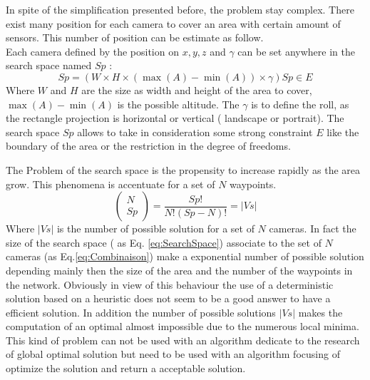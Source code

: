 In spite of the simplification presented before, the problem stay complex. There exist many position for each camera to cover an area with certain amount of sensors. This number of position can be estimate as follow.\\   
Each camera defined by the position on $x, y, z $ and $ \gamma$ can be set anywhere in the search space  named $Sp$ : 
\begin{equation}\label{eq:SearchSpace}
 Sp=(W\times H \times ( \max(A)-\min(A)) \times \gamma )  Sp \in E 
\end{equation}
Where $W$ and $H$ are the size as width and height of the area to cover, $\max(A)-\min(A)$  is the possible altitude. The $\gamma$ is to define the roll, as the rectangle projection is horizontal or vertical ( landscape or portrait). The search space $Sp$ allows to take in consideration some strong constraint $E$ like the boundary of the area or the restriction in the degree of freedoms.

The Problem of the search space is the propensity to increase rapidly as the area grow. This phenomena is accentuate for a set of $N$  waypoints.
 \begin{equation} \label{eq:Combinaison}
 \begin{pmatrix} N \\ Sp \end{pmatrix}  = \frac{Sp!}{N!(Sp-N)!} = |Vs|
 \end{equation} 
 Where $|Vs|$ is the number of possible solution for a set of $N$ cameras. %
 In fact the size of the search space ( as Eq. \ref{eq:SearchSpace}) associate to the set of $N$ cameras (as Eq.\ref{eq:Combinaison}) make a exponential number of possible solution depending mainly then the size of the area and the number of the waypoints in the network. 
 Obviously in view of this behaviour the use of a deterministic solution based on a heuristic does not seem to be a good answer to have a efficient solution. In addition the number of possible solutions $|Vs|$ makes the computation of an optimal almost impossible due to the numerous local minima. This kind of problem can not be used with an algorithm dedicate to the research of global optimal solution but need to be used with an algorithm focusing of optimize the solution and return a acceptable solution.
 

